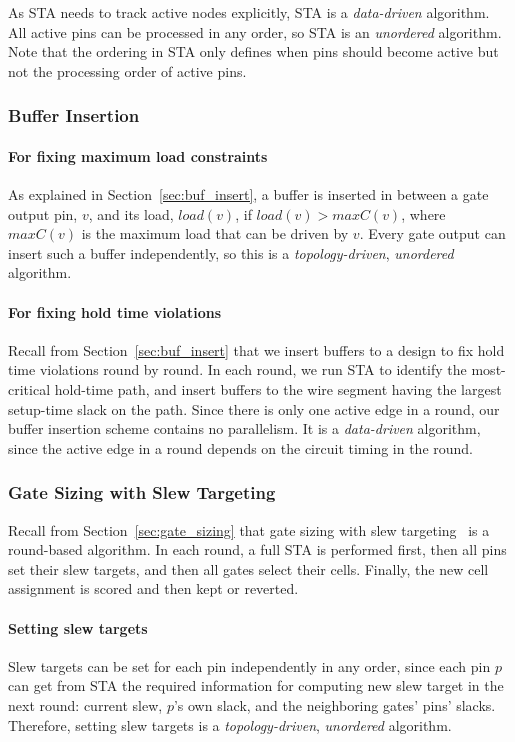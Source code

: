 As STA needs to track active nodes explicitly, STA is a {\em data-driven} algorithm. All active pins can be processed in any order, so STA is an {\em unordered} algorithm. Note that the ordering in STA only defines when pins should become active but not the processing order of active pins.

\subsubsection{Buffer Insertion}

\paragraph{For fixing maximum load constraints} As explained in Section~\ref{sec:buf_insert}, a buffer is inserted in between a gate output pin, $v$, and its load, $load(v)$, if $load(v) > maxC(v)$, where $maxC(v)$ is the maximum load that can be driven by $v$.
Every gate output can insert such a buffer independently, so this is a {\em topology-driven}, {\em unordered} algorithm.

\paragraph{For fixing hold time violations} Recall from Section~\ref{sec:buf_insert} that we insert buffers to a design to fix hold time violations round by round. In each round, we run STA to identify the most-critical hold-time path, and insert buffers to the wire segment having the largest setup-time slack on the path. Since there is only one active edge in a round, our buffer insertion scheme contains no parallelism. It is a {\em data-driven} algorithm, since the active edge in a round depends on the circuit timing in the round.

\subsubsection{Gate Sizing with Slew Targeting}

Recall from Section~\ref{sec:gate_sizing} that gate sizing with slew targeting~\cite{Held:Gate} is a round-based algorithm. In each round, a full STA is performed first, then all pins set their slew targets, and then all gates select their cells. Finally, the new cell assignment is scored and then kept or reverted.

\paragraph{Setting slew targets} Slew targets can be set for each pin independently in any order, since each pin $p$ can get from STA the required information for computing new slew target in the next round: current slew, $p$'s own slack, and the neighboring gates' pins' slacks. Therefore, setting slew targets is a {\em topology-driven}, {\em unordered} algorithm.

